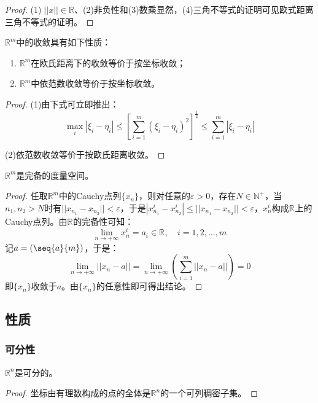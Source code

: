 \begin{proof}
	(1)$\;||x||\in\mathbb{R}$、(2)非负性和(3)数乘显然，(4)三角不等式的证明可见欧式距离三角不等式的证明。
\end{proof}
\begin{property}\label{prop:RmConvergence}
	$\mathbb{R}^{m}$中的收敛具有如下性质：
	\begin{enumerate}
		\item $\mathbb{R}^{m}$在欧氏距离下的收敛等价于按坐标收敛；
		\item $\mathbb{R}^{m}$中依范数收敛等价于按坐标收敛。
	\end{enumerate}
\end{property}
\begin{proof}
	(1)由下式可立即推出：
	\begin{equation*}
		\max_i|\xi_i-\eta_i|\leqslant	\left[\sum_{i=1}^m(\xi_i-\eta_i)^2\right]^{\frac{1}{2}}\leqslant\sum_{i=1}^{m}|\xi_i-\eta_i|
	\end{equation*}\par
	(2)依范数收敛等价于按欧氏距离收敛。
\end{proof}
\begin{theorem}
	$\mathbb{R}^{m}$是完备的度量空间。
\end{theorem}
\begin{proof}
	任取$\mathbb{R}^{m}$中的Cauchy点列$\{x_n\}$，则对任意的$\varepsilon>0$，存在$N\in\mathbb{N}^+$，当$n_1,n_2>N$时有$||x_{n_1}-x_{n_2}||<\varepsilon$，于是$|x_{n_1}^i-x_{n_2}^i|\leqslant||x_{n_1}-x_{n_2}||<\varepsilon$，$x_{n}^i$构成$\mathbb{R}^{}$上的Cauchy点列。由$\mathbb{R}^{}$的完备性可知：
	\begin{equation*}
		\lim_{n\to+\infty}x_n^i=a_i\in\mathbb{R}^{},\quad i=1,2,\dots,m
	\end{equation*}
	记$a=(\seq{a}{m})$，于是：
	\begin{equation*}
		\lim_{n\to+\infty}||x_n-a||=\lim_{n\to+\infty}\left(\sum_{i=1}^{m}||x_n-a||\right)=0
	\end{equation*}
	即$\{x_n\}$收敛于$a$。由$\{x_n\}$的任意性即可得出结论。
\end{proof}

\subsection{性质}
\subsubsection{可分性}
\begin{theorem}
	$\mathbb{R}^{n}$是可分的。
\end{theorem}
\begin{proof}
	坐标由有理数构成的点的全体是$\mathbb{R}^{n}$的一个可列稠密子集。
\end{proof}